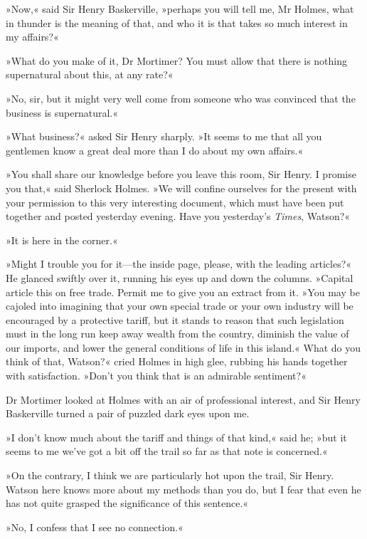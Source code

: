 »Now,« said Sir Henry Baskerville, »perhaps you will tell me, Mr Holmes, what in thunder is the meaning of that, and who it is that takes so much interest in my affairs?«

»What do you make of it, Dr Mortimer? You must allow that there is nothing supernatural about this, at any rate?«

»No, sir, but it might very well come from someone who was convinced that the business is supernatural.«

»What business?« asked Sir Henry sharply. »It seems to me that all you gentlemen know a great deal more than I do about my own affairs.«

»You shall share our knowledge before you leave this room, Sir Henry. I promise you that,« said Sherlock Holmes. »We will confine ourselves for the present with your permission to this very interesting document, which must have been put together and posted yesterday evening. Have you yesterday's \textit{Times}, Watson?«

»It is here in the corner.«

»Might I trouble you for it\allowbreak---\allowbreak the inside page, please, with the leading articles?«  He glanced swiftly over it, running his eyes up and down the columns. »Capital article this on free trade. Permit me to give you an extract from it. »You may be cajoled into imagining that your own special trade or your own industry will be encouraged by a protective tariff, but it stands to reason that such legislation must in the long run keep away wealth from the country, diminish the value of our imports, and lower the general conditions of life in this island.« What do you think of that, Watson?« cried Holmes in high glee, rubbing his hands together with satisfaction. »Don't you think that is an admirable sentiment?«


Dr Mortimer looked at Holmes with an air of professional interest, and Sir Henry Baskerville turned a pair of puzzled dark eyes upon me.

»I don't know much about the tariff and things of that kind,« said he; »but it seems to me we've got a bit off the trail so far as that note is concerned.«

»On the contrary, I think we are particularly hot upon the trail, Sir Henry. Watson here knows more about my methods than you do, but I fear that even he has not quite grasped the significance of this sentence.«

»No, I confess that I see no connection.«

